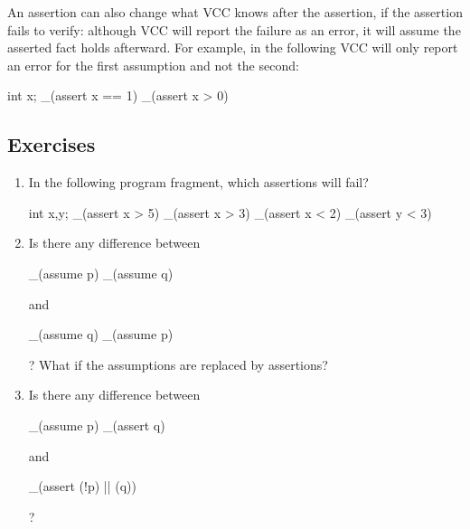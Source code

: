 An assertion can also change what VCC knows after the assertion, if
the assertion fails to verify: although VCC will report the failure as an error,
it will assume the asserted fact holds afterward. For example, in the following
VCC will only report an error for the first assumption and not the second:
\begin{VCC}
int x;
_(assert x == 1)
_(assert x > 0)
\end{VCC}

\subsection*{Exercises}
\begin{enumerate}
\item
In the following program fragment, which assertions will fail?
\begin{VCC}
int x,y; 
_(assert x > 5) 
_(assert x > 3) 
_(assert x < 2) 
_(assert y < 3)
\end{VCC}
\item
Is there any difference between 
\begin{VCC}
_(assume p)
_(assume q)
\end{VCC}
and 
\begin{VCC}
_(assume q) 
_(assume p)
\end{VCC}
? What if the assumptions are replaced by assertions?
\item
Is there any difference between
\begin{VCC}
_(assume p)
_(assert q)
\end{VCC}
and 
\begin{VCC}
_(assert (!p) || (q))
\end{VCC}
? 

\end{enumerate}
